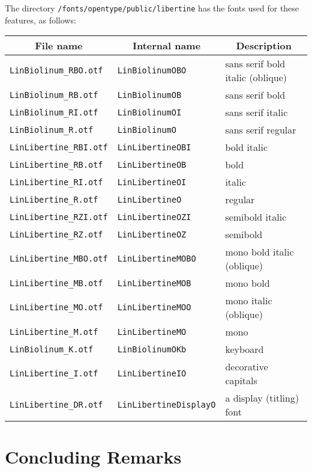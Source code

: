 \documentclass[11pt]{article}
\begin{document}
The directory
\verb|/fonts/opentype/public/libertine|
has the fonts used for these features, as follows:
\begin{list}{}{}\item\small
\begin{tabular}{lll}
\multicolumn{1}{c}{\bf File name} & \multicolumn{1}{c}{\bf Internal name} & \multicolumn{1}{c}{\bf Description} \\
\hline
\verb|LinBiolinum_RBO.otf|  & \verb|LinBiolinumOBO|  & sans serif bold italic (oblique) \\
\verb|LinBiolinum_RB.otf|  & \verb|LinBiolinumOB| & sans serif bold \\
\verb|LinBiolinum_RI.otf|  & \verb|LinBiolinumOI| & sans serif italic \\
\verb|LinBiolinum_R.otf|  & \verb|LinBiolinumO| & sans serif regular \\
\verb|LinLibertine_RBI.otf|  & \verb|LinLibertineOBI| & bold italic \\
\verb|LinLibertine_RB.otf|  & \verb|LinLibertineOB| & bold \\
\verb|LinLibertine_RI.otf|  & \verb|LinLibertineOI| & italic \\
\verb|LinLibertine_R.otf|  & \verb|LinLibertineO| & regular \\
\verb|LinLibertine_RZI.otf|  & \verb|LinLibertineOZI| & semibold italic \\
\verb|LinLibertine_RZ.otf|  & \verb|LinLibertineOZ| & semibold \\
\verb|LinLibertine_MBO.otf| & \verb|LinLibertineMOBO| & mono bold italic (oblique) \\
\verb|LinLibertine_MB.otf| & \verb|LinLibertineMOB| & mono bold \\
\verb|LinLibertine_MO.otf| & \verb|LinLibertineMOO| & mono italic (oblique) \\
\verb|LinLibertine_M.otf| & \verb|LinLibertineMO| & mono \\
\verb|LinBiolinum_K.otf|  & \verb|LinBiolinumOKb| & keyboard \\
\verb|LinLibertine_I.otf|  & \verb|LinLibertineIO| &   decorative capitals \\
\verb|LinLibertine_DR.otf| & \verb|LinLibertineDisplayO| &   a display (titling) font  \\
\end{tabular}
\end{list}

\section{Concluding Remarks}
\end{document}
